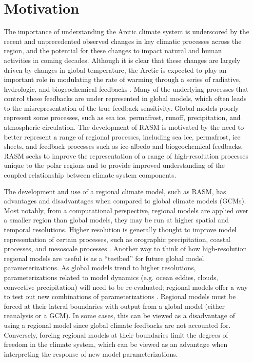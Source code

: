 \section{Motivation}

The importance of understanding the Arctic climate system is underscored by the recent and unprecedented observed changes in key climatic processes across the region, and the potential for these changes to impact natural and human activities in coming decades.
Although it is clear that these changes are largely driven by changes in global temperature, the Arctic is expected to play an important role in modulating the rate of warming through a series of radiative, hydrologic, and biogeochemical feedbacks \citep[e.g. ][]{Holland_2003}.
Many of the underlying processes that control these feedbacks are under represented in global models, which often leads to the misrepresentation of the true feedback sensitivity.
Global models poorly represent some processes, such as sea ice, permafrost, runoff, precipitation, and atmospheric circulation.
The development of RASM is motivated by the need to better represent a range of regional processes, including sea ice, permafrost, ice sheets, and feedback processes such as ice-albedo and biogeochemical feedbacks.
RASM seeks to improve the representation of a range of high-resolution processes unique to the polar regions and to provide improved understanding of the coupled relationship between climate system components.

The development and use of a regional climate model, such as RASM, has advantages and disadvantages when compared to global climate models (GCMs).
Most notably, from a computational perspective, regional models are applied over a smaller region than global models, they may be run at higher spatial and temporal resolutions.
Higher resolution is generally thought to improve model representation of certain processes, such as orographic precipitation, coastal processes, and mesoscale processes \citep{Feser_2011}.
Another way to think of how high-resolution regional models are useful is as a ``testbed'' for future global model parameterizations.
As global models trend to higher resolutions, parameterizations related to model dynamics (e.g. ocean eddies, clouds, convective precipitation) will need to be re-evaluated; regional models offer a way to test out new combinations of parameterizations \citep[e.g. ][]{Roberts_2015a,Cassano_2016}.
Regional models must be forced at their lateral boundaries with output from a global model (either reanalysis or a GCM).
In some cases, this can be viewed as a disadvantage of using a regional model since global climate feedbacks are not accounted for.
Conversely, forcing regional models at their boundaries limit the degrees of freedom in the climate system, which can be viewed as an advantage when interpreting the response of new model parameterizations.

